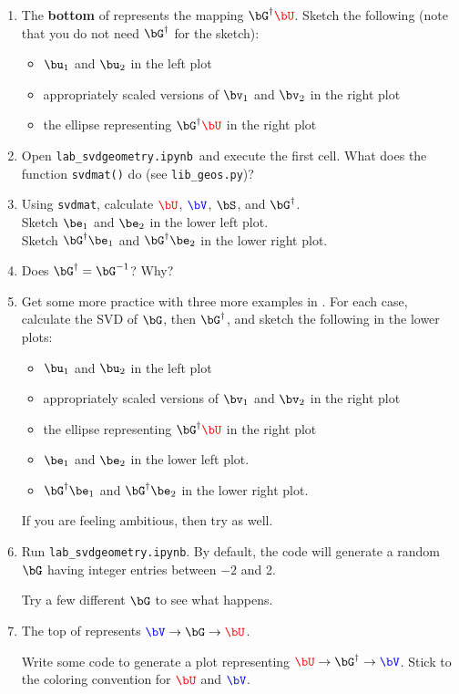 \documentclass[11pt,titlepage,fleqn]{article}
\newcommand{\tfile}{{\tt lab\_svdgeometry.ipynb}}
\begin{document}
\begin{enumerate}

\item The {\bf bottom} of  represents the mapping $\bG^{\dagger}\Ucolor$. Sketch the following (note that you do not need $\bG^{\dagger}$ for the sketch):
%
\begin{itemize}
\item $\bu_1$ and $\bu_2$ in the left plot
\item appropriately scaled versions of $\bv_1$ and $\bv_2$ in the right plot
\item the ellipse representing $\bG^{\dagger}\Ucolor$ in the right plot
\end{itemize}

\item Open \tfile\ and execute the first cell. What does the function \verb+svdmat()+ do (see \verb+lib_geos.py+)?

\item Using \verb+svdmat+, calculate $\Ucolor$, $\Vcolor$, $\bS$, and $\bG^{\dagger}$. \\
Sketch $\be_1$ and $\be_2$ in the lower left plot. \\
Sketch $\bG^{\dagger}\be_1$ and $\bG^{\dagger}\be_2$ in the lower right plot.

\item Does $\bG^{\dagger} = \bG^{-1}$? Why?

\item Get some more practice with three more examples in . For each case, calculate the SVD of $\bG$, then $\bG^{\dagger}$, and sketch the following in the lower plots:
%
%
\begin{itemize}
\item $\bu_1$ and $\bu_2$ in the left plot
\item appropriately scaled versions of $\bv_1$ and $\bv_2$ in the right plot
\item the ellipse representing $\bG^{\dagger}\Ucolor$ in the right plot
\item $\be_1$ and $\be_2$ in the lower left plot.
\item $\bG^{\dagger}\be_1$ and $\bG^{\dagger}\be_2$ in the lower right plot.
\end{itemize}
%
If you are feeling ambitious, then try  as well.

\item Run \tfile. By default, the code will generate a random $\bG$ having integer entries between $-2$ and 2.

Try a few different $\bG$ to see what happens.

\item The top of  represents $\Vcolor \rightarrow \bG \rightarrow \Ucolor$.

Write some code to generate a plot representing $\Ucolor \rightarrow \bG^{\dagger} \rightarrow \Vcolor$. Stick to the coloring convention for $\Ucolor$ and $\Vcolor$.

\end{enumerate}
\end{document}
